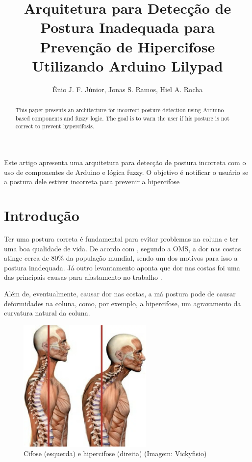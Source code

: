 \documentclass[12pt]{article}
\title{Arquitetura para Detecção de Postura Inadequada para Prevenção de Hipercifose Utilizando Arduino Lilypad}
\author{Ênio J. F. Júnior\inst{1}, Jonas S. Ramos\inst{1}, Hiel A. Rocha\inst{1} }
\begin{document}
 

\maketitle

\begin{abstract}
  This paper presents an architecture for incorrect posture detection using Arduino based components and fuzzy logic. The goal is to warn the user if his posture is not correct to prevent hypercifosis.
\end{abstract}
     
\begin{resumo} 
  Este artigo apresenta uma arquitetura para detecção de postura incorreta com o uso de componentes de Arduino e lógica fuzzy. O objetivo é notificar o usuário se a postura dele estiver incorreta para prevenir a hipercifose
\end{resumo}

\section{Introdução}

Ter uma postura correta é fundamental para evitar problemas na coluna e ter uma boa qualidade de vida. De acordo com \cite{cru:17}, segundo a OMS, a dor nas costas atinge cerca de 80\% da população mundial, sendo um dos motivos para isso a postura inadequada. Já outro levantamento aponta que dor nas costas foi uma das principais causas para afastamento no trabalho \cite{ig:17}.  

Além de, eventualmente, causar dor nas costas, a má postura pode de causar deformidades na coluna, como, por exemplo, a hipercifose, um agravamento da curvatura natural da coluna. 

\begin{figure}[ht]
\centering
\includegraphics{fig4.png}
\caption{Cifose (esquerda) e hipercifose (direita) (Imagem: Vickyfisio)}
\label{fig:example4}
\end{figure}
\end{document}
